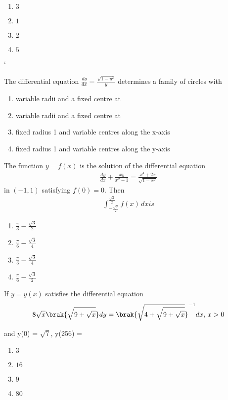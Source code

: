 \begin{multicols}{2}
\begin{enumerate}
    \item $3$
    \item $1$ 
    \item $2$
    \item $5$
\end{enumerate}
\end{multicols}
`
\item The differential equation $\frac{dy}{dx} = \frac{\sqrt{1-y^2}}{y}$ determines a family of circles with \hfill {}
\begin{enumerate}
    \item variable radii and a fixed centre at 
    \item variable radii and a fixed centre at 
    \item fixed radius 1 and variable centres along the x-axis
    \item fixed radius 1 and variable centres along the y-axis
\end{enumerate}
\item The function $y = f(x)$ is the solution of the differential equation \hfill {}
\begin{align}
\frac{dy}{dx} + \frac{xy}{x^2-1} = \frac{x^4 + 2x}{\sqrt{1-x^2}}
\end{align}
in $(-1, 1)$ satisfying $f(0) = 0$. Then
\begin{align}
\int_{-\frac{\sqrt{3}}{2}}^{\frac{\sqrt{3}}{2}} f(x) \, dx is
\end{align}

\begin{multicols}{2}
\begin{enumerate}
    \item $\frac{\pi}{3} - \frac{\sqrt{3}}{2}$
    \item $\frac{\pi}{6} - \frac{\sqrt{3}}{4}$
    \item $\frac{\pi}{3} - \frac{\sqrt{3}}{4}$ 
    \item $\frac{\pi}{6} - \frac{\sqrt{3}}{2}$
\end{enumerate}
\end{multicols}

\item If $y = y(x)$ satisfies the differential equation\hfill {}
\begin{align}
8\sqrt{x} \brak{\sqrt{9+\sqrt{x}}} dy = \brak{\sqrt{4+\sqrt{9+\sqrt{x}}}}^{-1} dx, \, x>0
\end{align}

and y(0) = $\sqrt{7}$,  y(256) = 

\begin{multicols}{2}
\begin{enumerate}
    \item $3$
    \item $16$ 
    \item $9$
    \item $80$
\end{enumerate}
\end{multicols}
